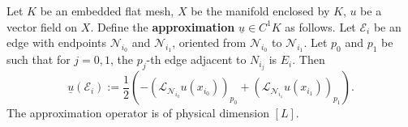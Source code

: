 \begin{definition}
  \label{cmc/vector_field_to_1_cochain/definition}
  Let
    $K$ be an embedded flat mesh,
    $X$ be the manifold enclosed by $K$,
    $u$ be a vector field on $X$.
  Define the \textbf{approximation} $\underline{u} \in C^1 K$ as follows.
  Let $\mathcal{E}_i$ be an edge with endpoints $\mathcal{N}_{i_0}$ and
  $\mathcal{N}_{i_1}$, oriented from $\mathcal{N}_{i_0}$ to $\mathcal{N}_{i_1}$.
  Let $p_0$ and $p_1$ be such that for $j = 0, 1$,
  the $p_j$-th edge adjacent to $N_{i_j}$ is $E_i$.
  Then
  \begin{equation}
    \underline{u}(\mathcal{E}_i) :=
      \frac{1}{2}
      ( - (\mathcal{L}_{\mathcal{N}_{i_0}} u(x_{i_0}))_{p_0}
        + (\mathcal{L}_{\mathcal{N}_{i_1}} u(x_{i_1}))_{p_1}
      ).
  \end{equation}
  The approximation operator is of physical dimension $[L]$.
\end{definition}
